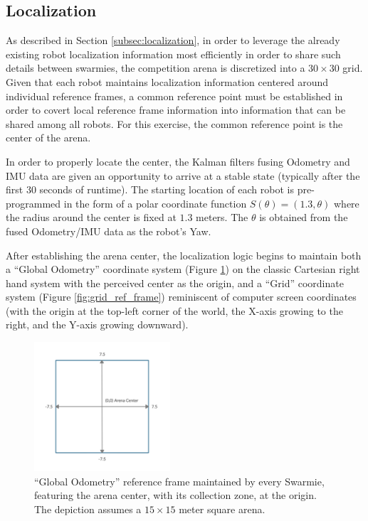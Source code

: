 \documentclass[sigconf,authordraft]{acmart}
\begin{document}
\subsection{Localization}\label{subsec:localization_method}
As described in Section \ref{subsec:localization}, in order to leverage the already existing robot localization information most efficiently in order to share such details between swarmies, the competition arena is discretized into a $30 \times 30$ grid. Given that each robot maintains localization information centered around individual reference frames, a common reference point must be established in order to covert local reference frame information into information that can be shared among all robots. For this exercise, the common reference point is the center of the arena.

In order to properly locate the center, the Kalman filters fusing Odometry and IMU data are given an opportunity to arrive at a stable state (typically after the first 30 seconds of runtime). The starting location of each robot is pre-programmed in the form of a polar coordinate function $S(\theta) = (1.3, \theta)$ where the radius around the center is fixed at $1.3$ meters. The $\theta$ is obtained from the fused Odometry/IMU data as the robot's Yaw.

After establishing the arena center, the localization logic begins to maintain both a ``Global Odometry'' coordinate system (Figure \ref{fig:global_ref_frame}) on the classic Cartesian right hand system with the perceived center as the origin, and a ``Grid'' coordinate system (Figure \ref{fig:grid_ref_frame}) reminiscent of computer screen coordinates (with the origin at the top-left corner of the world, the X-axis growing to the right, and the Y-axis growing downward).

\begin{figure}[ht!]
  \centering
  \includegraphics[width=0.45\textwidth]{images/global_ref_frame.png}
  \caption{``Global Odometry'' reference frame maintained by every Swarmie, featuring the arena center, with its collection zone, at the origin. The depiction assumes a $15 \times 15$ meter square arena.}
  \label{fig:global_ref_frame}
\end{figure}
\end{document}

